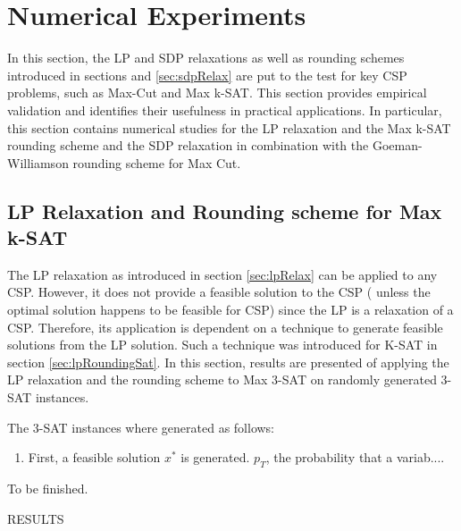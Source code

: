 \section{Numerical Experiments}
In this section, the LP and SDP relaxations as well as rounding schemes introduced in sections \label{sec:lpRelax} and \ref{sec:sdpRelax} are put to the test for key CSP problems, such as Max-Cut and Max k-SAT. This section provides empirical validation and identifies their usefulness in practical applications. In particular, this section contains numerical studies for the LP relaxation and the Max k-SAT rounding scheme and the SDP relaxation in combination with the Goeman-Williamson rounding scheme for Max Cut. 

\subsection{LP Relaxation and Rounding scheme for Max k-SAT}
The LP relaxation as introduced in section \ref{sec:lpRelax} can be applied to any CSP. However, it does not provide a feasible solution to the CSP ( unless the optimal solution happens to be feasible for CSP) since the LP is a relaxation of a CSP. Therefore, its application is dependent on a technique to generate feasible solutions from the LP solution. Such a technique was introduced for K-SAT in section \ref{sec:lpRoundingSat}. In this section, results are presented of applying the LP relaxation and the rounding scheme to Max 3-SAT on randomly generated 3-SAT instances.

The 3-SAT instances where generated as follows:
\begin{enumerate}
	\item First, a feasible solution $x^*$ is generated. $p_T$, the probability that a variab....
\end{enumerate}

To be finished.

RESULTS

